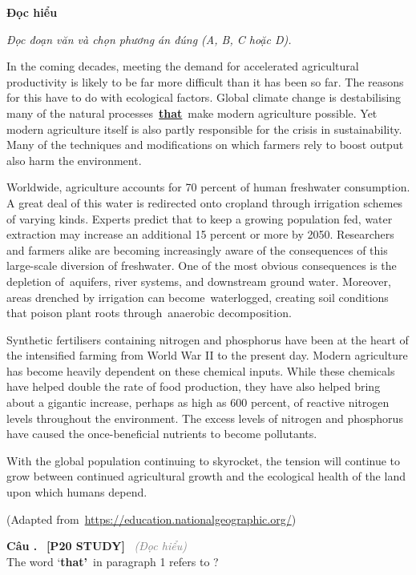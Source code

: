 \documentclass[12pt,a4paper,twoside]{article}
\newcounter{qcounter}
\newcommand{\question}[2][]{%
    \stepcounter{qcounter}%
    \par\vspace{6pt}%
    \noindent\textcolor{primaryBlue}{\textbf{Câu \theqcounter.}}~%
    \textcolor{secondaryBlue}{\small\textbf{[P20 STUDY]}}~%
    \if\relax\detokenize{#1}\relax\else\textcolor{gray}{\small\textit{(#1)}}~\fi\\[1pt]
    \noindent #2%
}
\newenvironment{readingpassage}[1][]{%
    \begin{tcolorbox}[enhanced, colback=grayLight, colframe=secondaryBlue,
        coltitle=textDark, fonttitle=\bfseries, title={#1},
        rounded corners, arc=3mm, boxrule=1pt,
        left=15pt, right=15pt, top=10pt, bottom=10pt,
        breakable, before skip=10pt, after skip=10pt, drop fuzzy shadow]
    \setstretch{1.3}
}{\end{tcolorbox}}
\begin{document}
\begin{groupbox}\textbf{\large Đọc hiểu}\end{groupbox}
\textit{Đọc đoạn văn và chọn phương án đúng (A, B, C hoặc D).}
\begin{readingpassage}[]
In the coming decades, meeting the demand for accelerated agricultural productivity is likely to be far more difficult than it has been so far. The reasons for this have to do with ecological factors. Global climate change is destabilising many of the natural processes \underline{\textbf{that}} make modern agriculture possible. Yet modern agriculture itself is also partly responsible for the crisis in sustainability. Many of the techniques and modifications on which farmers rely to boost output also harm the environment.

Worldwide, agriculture accounts for 70 percent of human freshwater consumption. A great deal of this water is redirected onto cropland through irrigation schemes of varying kinds. Experts predict that to keep a growing population fed, water extraction may increase an additional 15 percent or more by 2050. Researchers and farmers alike are becoming increasingly aware of the consequences of this large-scale diversion of freshwater. One of the most obvious consequences is the depletion of aquifers, river systems, and downstream ground water. Moreover, areas drenched by irrigation can become waterlogged, creating soil conditions that poison plant roots through anaerobic decomposition.

Synthetic fertilisers containing nitrogen and phosphorus have been at the heart of the intensified farming from World War II to the present day. Modern agriculture has become heavily dependent on these chemical inputs. While these chemicals have helped double the rate of food production, they have also helped bring about a gigantic increase, perhaps as high as 600 percent, of reactive nitrogen levels throughout the environment. The excess levels of nitrogen and phosphorus have caused the once-beneficial nutrients to become pollutants.

With the global population continuing to skyrocket, the tension will continue to grow between continued agricultural growth and the ecological health of the land upon which humans depend.

(Adapted from \underline{https://education.nationalgeographic.org/})
\end{readingpassage}

\question[Đọc hiểu]{The word ‘\textbf{that’} in paragraph 1 refers to \underline{\hspace{1.3cm}}?}
\end{document}
